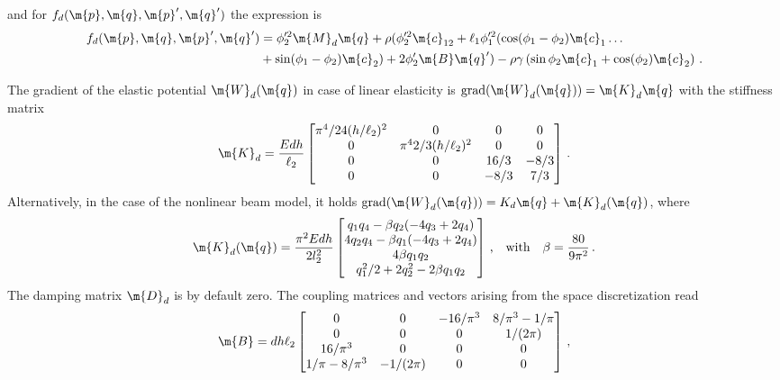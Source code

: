 %
and for $f_{d}(\m{p}, \m{q}, \m{p}^\prime, \m{q}^\prime)$ the expression is
%
\begin{align*}
  f_{d}(\m{p}, \m{q}, \m{p}^\prime, \m{q}^\prime) &= \phi_2^{\prime2} \m{M}_{d} \m{q}+\rho(\phi_2^{\prime2} \m{c}_{12}+\ell_1 \phi_1^{\prime2}(\cos(\phi_1 - \phi_2) \m{c}_1 \dots \\
  &+ \sin(\phi_1 - \phi_2) \m{c}_2)+2 \phi_2^\prime \m{B} \m{q}^\prime)-\rho \gamma\left(\sin \phi_2 \m{c}_1+\cos(\phi_2) \m{c}_2\right) \, \text{.}
\end{align*}

The gradient of the elastic potential $\m{W}_{d}(\m{q})$ in case of linear elasticity is $\mathrm{grad}(\m{W}_{d}(\m{q})) = \m{K}_{d} \m{q}$ with the stiffness matrix
%
\begin{equation*}
  \m{K}_{d} = \dfrac{E d h}{\ell_2} \begin{bmatrix}
    \pi^4/24(h/\ell_2)^2 & 0                    & 0    & 0    \\
    0                   & \pi^4 2/3(h/\ell_2)^2 & 0    & 0    \\
    0                   & 0                     & 16/3 & -8/3 \\
    0                   & 0                     & -8/3 & 7/3
  \end{bmatrix} \, \text{.}
\end{equation*}
%
Alternatively, in the case of the nonlinear beam model, it holds $\mathrm{grad}(\m{W}_{d}(\m{q})) = K_{d}\m{q} + \m{K}_{d}(\m{q})$, where
%
\begin{equation*}
  \m{K}_{d}(\m{q}) = \dfrac{\pi^2 E d h}{2l_2^2} \begin{bmatrix}
    q_1 q_4 - \beta q_2(-4q_3 + 2q_4) \\
    4 q_2 q_4 - \beta q_1(-4q_3 + 2q_4) \\
    4 \beta q_1 q_2 \\
    q_1^2/2 + 2q_2^2 - 2 \beta q_1 q_2
  \end{bmatrix} \, \text{,}
  \quad \text{with} \quad
  \beta = \dfrac{80}{9\pi^2} \, \text{.}
\end{equation*}
%
The damping matrix $\m{D}_{d}$ is by default zero. The coupling matrices and vectors arising from the space discretization read
%
\begin{equation*}
  \m{B} = d h \ell_2 \begin{bmatrix}
    0             & 0         & -16/\pi^3 & 8/\pi^3-1/\pi \\
    0             & 0         & 0         & 1/(2\pi)      \\
    16/\pi^3      & 0         & 0         & 0             \\
    1/\pi-8/\pi^3 & -1/(2\pi) & 0         & 0
  \end{bmatrix} \, \text{,}
\end{equation*}
